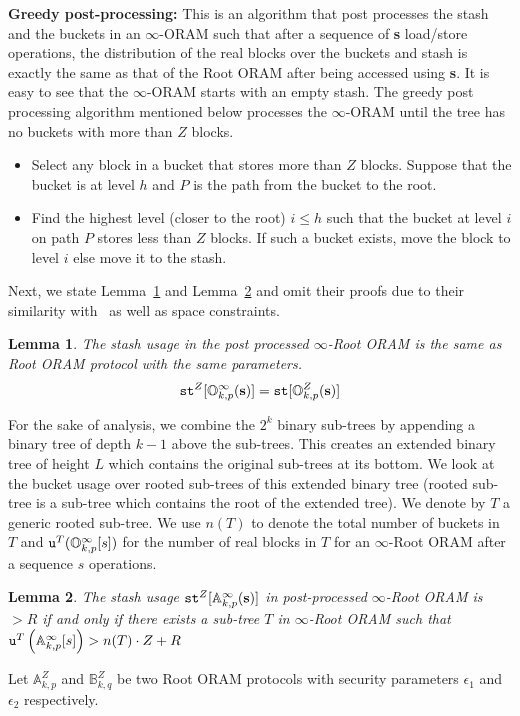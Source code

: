 \documentclass[USenglish,oneside,twocolumn]{article}
\newtheorem{lemma}{Lemma}
\newcommand{\ourprotocol}{Root ORAM}
\begin{document}
\textbf{Greedy post-processing: }This is an algorithm that post processes the stash and the buckets in an $\infty$-ORAM such that after a sequence of \textbf{s} load/store operations, the distribution of the real blocks over the buckets and stash is exactly the same as that of the \ourprotocol{} after being accessed using \textbf{s}. It is easy to see that the $\infty$-ORAM starts with an empty stash. The greedy post processing algorithm mentioned below processes the $\infty$-ORAM until the tree has no buckets with more than $Z$ blocks. 
\vspace{-5pt}
\begin{itemize}
\itemsep0em
\item Select any block in a bucket that stores more than $Z$ blocks. Suppose that the bucket is at level $h$ and $P$ is the path from the bucket to the root.
\item Find the highest level (closer to the root) $i \leq h$ such that the bucket at level $i$ on path $P$ stores less than $Z$ blocks. If such a bucket exists, move the block to level $i$ else move it to the stash.
\end{itemize}
\vspace{-5pt}


Next, we state Lemma~\ref{lem:lemma1} and Lemma~\ref{lem:lemma2} and omit their proofs due to their similarity with~\cite{pathoram} as well as space constraints.

\begin{lemma}\label{lem:lemma1}
The stash usage in the post processed $\infty$-\ourprotocol{} is the same as \ourprotocol{} protocol with the same parameters.
\begin{equation}\label{eqn:lemma1}
{\tt st}^Z [\mathbb{O}_{k,p}^{\infty} (\textbf{s}) ] = {\tt st}[\mathbb{O}_{k,p}^Z (\textbf{s}) ]
\end{equation}
\end{lemma}
For the sake of analysis, we combine the $2^k$ binary sub-trees by appending a binary tree of depth $k-1$ above the sub-trees. This creates an extended binary tree of height $L$ which contains the original sub-trees at its bottom. We look at the bucket usage over rooted sub-trees of this extended binary tree (rooted sub-tree is a sub-tree which contains the root of the extended tree). We denote by $T$ a generic rooted sub-tree. We use $n(T)$ to denote the total number of buckets in $T$ and ${\tt u}^T(\mathbb{O}^{\infty}_{k,p} [s])$ for the number of real blocks in $T$ for an $\infty$-\ourprotocol{} after a sequence $s$ operations. 
\begin{lemma}\label{lem:lemma2}
The stash usage ${\tt st}^Z [\mathbb{A}_{k,p}^{\infty} (\textbf{s}) ]$ in post-processed $\infty$-\ourprotocol{} is $> R$ if and only if there exists a sub-tree $T$ in $\infty$-\ourprotocol{} such that ${\tt u}^T \left( \mathbb{A}^{\infty}_{k,p} [s] \right) > n(T)\cdot Z + R$
\end{lemma}
Let $\mathbb{A}_{k,p}^Z$ and $\mathbb{B}_{k,q}^Z$ be two \ourprotocol{} protocols with security parameters $\epsilon_1$ and $\epsilon_2$ respectively. 
\end{document}
